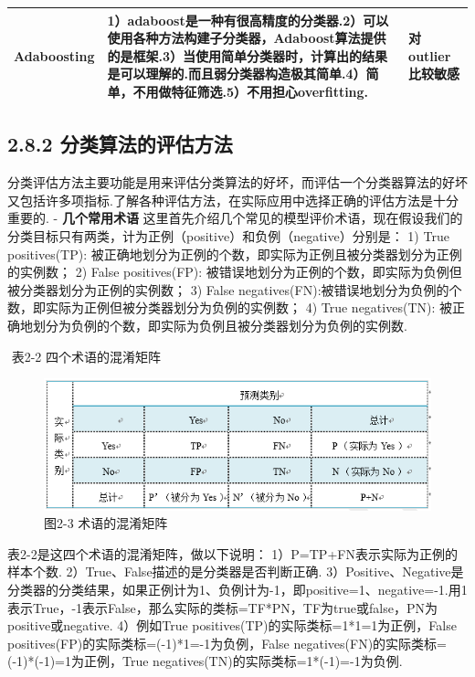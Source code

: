 \begin{longtable}[]{lll}
\begin{minipage}[t]{0.04\columnwidth}
Adaboosting\strut
\end{minipage} & \begin{minipage}[t]{0.04\columnwidth}\raggedright\strut
1）adaboost是一种有很高精度的分类器.2）可以使用各种方法构建子分类器，Adaboost算法提供的是框架.3）当使用简单分类器时，计算出的结果是可以理解的.而且弱分类器构造极其简单.4）简单，不用做特征筛选.5）不用担心overfitting.\strut
\end{minipage} & \begin{minipage}[t]{0.04\columnwidth}\raggedright\strut
对outlier比较敏感\strut
\end{minipage}\tabularnewline
 \bottomrule
\end{longtable}

\subsection{2.8.2
分类算法的评估方法}\label{ux5206ux7c7bux7b97ux6cd5ux7684ux8bc4ux4f30ux65b9ux6cd5}

​
分类评估方法主要功能是用来评估分类算法的好坏，而评估一个分类器算法的好坏又包括许多项指标.了解各种评估方法，在实际应用中选择正确的评估方法是十分重要的.
- \textbf{几个常用术语} ​
这里首先介绍几个常见的模型评价术语，现在假设我们的分类目标只有两类，计为正例（positive）和负例（negative）分别是：
1) True positives(TP):
被正确地划分为正例的个数，即实际为正例且被分类器划分为正例的实例数； 2)
False positives(FP):
被错误地划分为正例的个数，即实际为负例但被分类器划分为正例的实例数； 3)
False
negatives(FN):被错误地划分为负例的个数，即实际为正例但被分类器划分为负例的实例数；
4) True negatives(TN):
被正确地划分为负例的个数，即实际为负例且被分类器划分为负例的实例数.　

​ 表2-2 四个术语的混淆矩阵

\begin{figure}
\centering
\includegraphics{./img/ch2/2.9/1.png}
\caption{图2-3 术语的混淆矩阵}
\end{figure}

表2-2是这四个术语的混淆矩阵，做以下说明：
1）P=TP+FN表示实际为正例的样本个数.
2）True、False描述的是分类器是否判断正确.
3）Positive、Negative是分类器的分类结果，如果正例计为1、负例计为-1，即positive=1、negative=-1.用1表示True，-1表示False，那么实际的类标=TF*PN，TF为true或false，PN为positive或negative.
4）例如True positives(TP)的实际类标=1*1=1为正例，False
positives(FP)的实际类标=(-1)*1=-1为负例，False
negatives(FN)的实际类标=(-1)*(-1)=1为正例，True
negatives(TN)的实际类标=1*(-1)=-1为负例.


